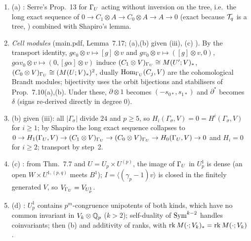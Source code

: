\begin{outline}
\begin{enumerate}
\item (a) \stcited: Serre's Prop.~13 for $\Gamma_U$ acting without inversion on the tree, i.e.\ the long exact sequence of
$0\to C_1\otimes A\to C_0\otimes A\to A\to0$ (exact because $\mathcal{T}_q$ is a tree, \cite[II.2.8, p.~126]{Se}) combined with Shapiro's lemma.
\item \emph{Cell modules} (main.pdf, Lemma~7.17; (a),(b) \stproved{} given (iii), (c) \stcited{} \cite[III.5.6(a), p.~69 and III.6.2, p.~73]{Br}).
By the transport identity, $ge_0\otimes v\mapsto[g]\otimes v$ and $gv_0\otimes v\mapsto([g]\otimes v,0)$, $g\alpha v_0\otimes v\mapsto(0,[g\alpha]\otimes v)$
induce $(C_1\otimes V)_{\Gamma_U}\cong M(U';V)_*$, $(C_0\otimes V)_{\Gamma_U}\cong(M(U;V)_*)^2$, dually $\operatorname{Hom}_{\Gamma_U}(C_j,V)$ are the
cohomological Brandt modules; bijectivity uses the orbit bijections and stabilisers of Prop.~7.10(a),(b). Under these, $\partial\otimes1$
becomes $(-s_{0*},s_{1*})$ and $\partial^*$ becomes $\delta$ (signs re-derived directly in degree $0$).
\item (b) \stpmc{} given (iii): all $|\Gamma_\sigma|$ divide $24$ and $p\ge5$, so $H_i(\Gamma_\sigma,V)=0=H^i(\Gamma_\sigma,V)$ for $i\ge1$; by
Shapiro the long exact sequence collapses to $0\to H_1(\Gamma_U,V)\to(C_1\otimes V)_{\Gamma_U}\to(C_0\otimes V)_{\Gamma_U}\to H_0(\Gamma_U,V)\to0$ and
$H_i=0$ for $i\ge2$; transport by step~2.
\item (c) \stpmc: from Thm.~7.7 and $U=U_p\times U^{(p)}$, the image of $\Gamma_U$ in $U^1_p$ is dense (an open $W\times U^{1,(p,q)}$ meets $B^1$);
$I=\langle(\gamma_p-1)v\rangle$ is closed in the finitely generated $V$, so $V_{\Gamma_U}=V_{U_p^1}$.
\item (d) \stpmc: $U^1_p$ contains $p^m$-congruence unipotents of both kinds, which have no common invariant in $V_k\otimes\mathbb{Q}_p$
($k>2$); self-duality of $\mathrm{Sym}^{k-2}$ handles coinvariants; then (b) and additivity of ranks, with $\operatorname{rk}M(\cdot;V_k)_*=\operatorname{rk}M(\cdot;V_k)$.
\end{enumerate}
\end{outline}

